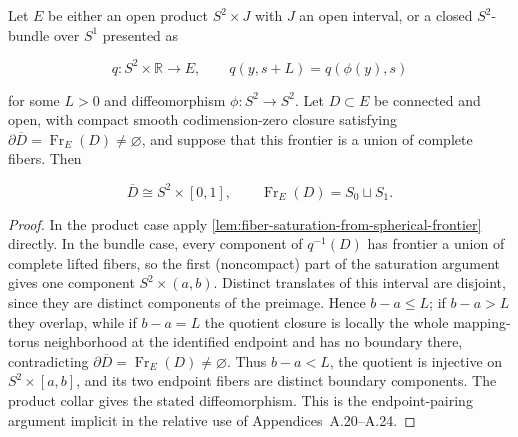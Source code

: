 \begin{lemma}
\label{lem:relative-fiber-boundary-pairing}
\notready
Let $E$ be either an open product $S^2\times J$ with $J$ an open interval,
or a closed $S^2$-bundle over $S^1$ presented as

\[
 q:S^2\times\mathbb R\longrightarrow E,
 \qquad q(y,s+L)=q(\phi(y),s)
\]

for some $L>0$ and diffeomorphism $\phi:S^2\to S^2$.  Let $D\subset E$ be
connected and open, with compact smooth codimension-zero closure satisfying
\(\partial\overline D=\operatorname{Fr}_E(D)\ne\varnothing\), and suppose
that this frontier is a union of complete fibers.  Then

\[
 \overline D\cong S^2\times[0,1],
 \qquad \operatorname{Fr}_E(D)=S_0\sqcup S_1.
\]
\end{lemma}

\begin{proof}
In the product case apply
\ref{lem:fiber-saturation-from-spherical-frontier} directly.  In the bundle
case, every component of $q^{-1}(D)$ has frontier a union of complete lifted
fibers, so the first (noncompact) part of the saturation argument gives one
component $S^2\times(a,b)$.  Distinct translates of this interval are
disjoint, since they are distinct components of the preimage.  Hence
$b-a\le L$; if $b-a>L$ they overlap, while if $b-a=L$ the quotient closure is
locally the whole mapping-torus neighborhood at the identified endpoint and
has no boundary there, contradicting
\(\partial\overline D=\operatorname{Fr}_E(D)\ne\varnothing\).  Thus
$b-a<L$, the quotient is injective on $S^2\times[a,b]$, and its two endpoint
fibers are distinct boundary components.  The product collar gives the stated
diffeomorphism.  This is the endpoint-pairing argument implicit in the
relative use of Appendices~A.20--A.24.
\end{proof}

